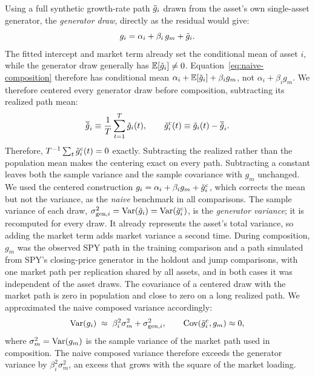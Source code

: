 Using a full synthetic growth-rate path $\tilde{g}_i$ drawn from the asset's
own single-asset generator, the \emph{generator draw}, directly as the
residual would give:
\begin{equation}\label{eq:naive-composition}
g_i = \alpha_i + \beta_i\, g_m + \tilde{g}_i.
\end{equation}
The fitted intercept and market term already set the conditional mean
of asset $i$, while the generator draw generally has
$\mathbb{E}[\tilde{g}_i]\ne 0$. Equation~\eqref{eq:naive-composition} therefore has
conditional mean $\alpha_i+\mathbb{E}[\tilde{g}_i]+\beta_i g_m$, not
$\alpha_i+\beta_i g_m$.
We therefore centered every generator draw before composition,
subtracting its realized path mean:
\begin{equation}
  \overline{\tilde{g}}_i \equiv \frac{1}{T}\sum_{t=1}^{T}\tilde{g}_i(t),
  \qquad
  \tilde{g}_i^{\mathrm c}(t) \equiv \tilde{g}_i(t)-\overline{\tilde{g}}_i.
  \label{eq:center-generator}
\end{equation}
Therefore, $T^{-1}\sum_t\tilde{g}_i^{\mathrm c}(t)=0$ exactly. Subtracting
the realized rather than the population mean makes the centering exact on every path. Subtracting a
constant leaves both the sample variance and the sample covariance with
$g_m$ unchanged. We used the centered construction
$g_i=\alpha_i+\beta_i g_m+\tilde{g}_i^{\mathrm c}$, which corrects the mean
but not the variance, as the \emph{naive} benchmark in all
comparisons. The sample variance of each draw,
$\sigma_{\mathrm{gen},i}^2=\operatorname{Var}(\tilde{g}_i)=\operatorname{Var}(\tilde{g}_i^{\mathrm c})$, is the
\emph{generator variance}; it is recomputed for every draw. It already represents the asset's total
variance, so adding the market term adds market variance a second
time. During composition, $g_m$ was the observed SPY path in the training
comparison and a path simulated from SPY's closing-price generator in the holdout
and jump comparisons, with one market path per replication shared by
all assets, and
in both cases it was independent of the asset draws. The covariance
of a centered draw with the market path is zero in population and close to zero on a long realized
path. We approximated the naive composed variance accordingly:
\begin{equation}
  \operatorname{Var}(g_i)
  \;\approx\; \beta_i^2\sigma_m^2 + \sigma_{\mathrm{gen},i}^2,
  \qquad \operatorname{Cov}(\tilde{g}_i^{\mathrm c},g_m)\approx 0,
  \label{eq:naive-inflation}
\end{equation}
where $\sigma_m^2=\operatorname{Var}(g_m)$ is the sample variance of the market path
used in composition. The naive composed variance therefore exceeds the generator variance
by $\beta_i^2\sigma_m^2$, an excess that grows with the square of the
market loading.

